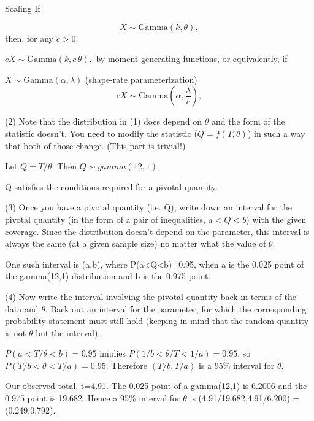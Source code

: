 



\begin{framed}
Scaling
If

\[{\displaystyle X\sim \mathrm {Gamma} (k,\theta ),}\]
then, for any $c > 0$,

${\displaystyle cX\sim \mathrm {Gamma} (k,c\,\theta ),}$ by moment generating functions,
or equivalently, if

${\displaystyle X\sim \mathrm {Gamma} \left(\alpha ,\lambda \right)}$ 
(shape-rate parameterization)
\[{\displaystyle cX\sim \mathrm {Gamma} \left(\alpha ,\frac{ \lambda  }{c}\right),}\]

\end{framed}



\begin{framed}
(2) Note that the distribution in (1) does depend on $\theta$ and the form of the statistic doesn't. You need to modify the statistic ($Q=f(T,\theta)$) in such a way that both of those change. (This part is trivial!)

Let $Q=T/\theta$. Then $Q\sim gamma(12,1)$.

Q satisfies the conditions required for a pivotal quantity.

(3) Once you have a pivotal quantity (i.e. Q), write down an interval for the pivotal quantity (in the form of a pair of inequalities, $a<Q<b$) with the given coverage. Since the distribution doesn't depend on the parameter, this interval is always the same (at a given sample size) no matter what the value of $\theta$.

One such interval is (a,b), where P(a<Q<b)=0.95, when a is the 0.025 point of the gamma(12,1) distribution and b is the 0.975 point.

(4) Now write the interval involving the pivotal quantity back in terms of the data and $\theta$. Back out an interval for the parameter, for which the corresponding probability statement must still hold (keeping in mind that the random quantity is not $\theta$ but the interval).

$P(a<T/\theta<b)=0.95$ implies $P(1/b<\theta/T<1/a)=0.95$, so $P(T/b<\theta<T/a)=0.95$. Therefore $(T/b,T/a)$ is a 95\% interval for $\theta$.

Our observed total, t=4.91. The 0.025 point of a gamma(12,1) is 6.2006 and the 0.975 point is 19.682. Hence a 95\% interval for $\theta$ is (4.91/19.682,4.91/6.200)
= (0.249,0.792).

\end{framed}

